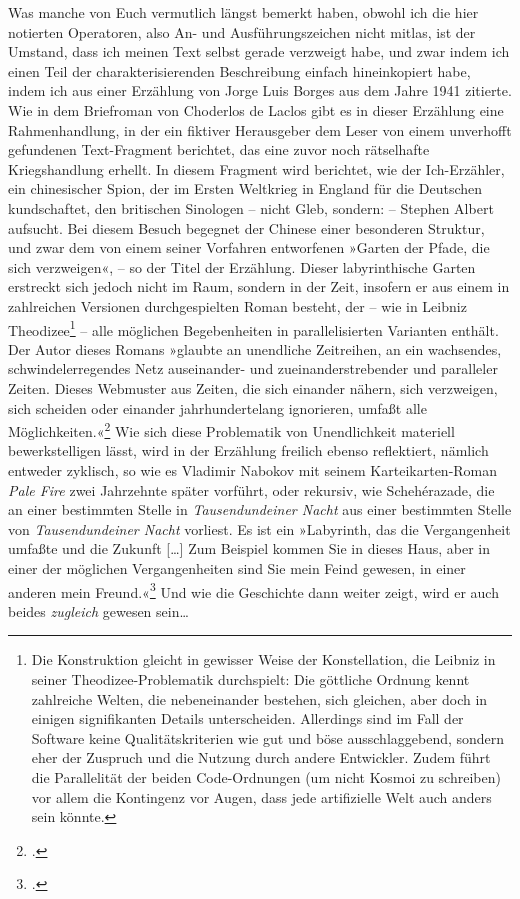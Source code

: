\documentclass[a4paper,11pt]{article}
\newcommand{\anf}[1]{»#1«}
\begin{document}
Was manche von Euch vermutlich längst bemerkt haben, obwohl ich die hier notierten Operatoren, also An- und Ausführungszeichen nicht mitlas, ist der Umstand, dass ich meinen Text selbst gerade verzweigt habe, und zwar indem ich einen Teil der charakterisierenden Beschreibung einfach hineinkopiert habe, indem ich aus einer Erzählung von Jorge Luis Borges aus dem Jahre 1941 zitierte. Wie in dem Briefroman von Choderlos de Laclos gibt es in dieser Erzählung eine Rahmenhandlung, in der ein fiktiver Herausgeber dem Leser von einem unverhofft gefundenen Text-Fragment berichtet, das eine zuvor noch rätselhafte Kriegshandlung erhellt. In diesem Fragment wird berichtet, wie der Ich-Erzähler, ein chinesischer Spion, der im Ersten Weltkrieg in England für die Deutschen kundschaftet, den britischen Sinologen – nicht Gleb, sondern: – Stephen Albert aufsucht. Bei diesem Besuch begegnet der Chinese einer besonderen Struktur, und zwar dem von einem seiner Vorfahren entworfenen \anf{Garten der Pfade, die sich verzweigen}, – so der Titel der Erzählung. Dieser labyrinthische Garten erstreckt sich jedoch nicht im Raum, sondern in der Zeit, insofern er aus einem in zahlreichen Versionen durchgespielten Roman besteht, der – wie in Leibniz Theodizee\footnote{Die Konstruktion gleicht in gewisser Weise der Konstellation, die Leibniz in seiner Theodizee-Problematik durchspielt: Die göttliche Ordnung kennt zahlreiche Welten, die nebeneinander bestehen, sich gleichen, aber doch in einigen signifikanten Details unterscheiden. Allerdings sind im Fall der Software keine Qualitätskriterien wie gut und böse ausschlaggebend, sondern eher der Zuspruch und die Nutzung durch andere Entwickler. Zudem führt die Parallelität der beiden Code-Ordnungen (um nicht Kosmoi zu schreiben) vor allem die Kontingenz vor Augen, dass jede artifizielle Welt auch anders sein könnte.} – alle möglichen Begebenheiten in parallelisierten Varianten enthält. Der Autor dieses Romans \anf{glaubte an unendliche Zeitreihen, an ein wachsendes, schwindelerregendes Netz auseinander- und zueinanderstrebender und paralleler Zeiten. Dieses Webmuster aus Zeiten, die sich einander nähern, sich verzweigen, sich scheiden oder einander jahrhundertelang ignorieren, umfaßt alle Möglichkeiten.}\footcite[172]{borges:1941} Wie sich diese Problematik von Unendlichkeit materiell bewerkstelligen lässt, wird in der Erzählung freilich ebenso reflektiert, nämlich entweder zyklisch, so wie es Vladimir Nabokov mit seinem Karteikarten-Roman \emph{Pale Fire} zwei Jahrzehnte später vorführt, oder rekursiv, wie Schehérazade, die an einer bestimmten Stelle in \emph{Tausendundeiner Nacht} aus einer bestimmten Stelle von \emph{Tausendundeiner Nacht} vorliest. Es ist ein \anf{Labyrinth, das die Vergangenheit umfaßte und die Zukunft [\ldots] Zum Beispiel kommen Sie in dieses Haus, aber in einer der möglichen Vergangenheiten sind Sie mein Feind gewesen, in einer anderen mein Freund.}\footcite[166/170]{borges:1941} Und wie die Geschichte dann weiter zeigt, wird er auch beides \emph{zugleich} gewesen sein\ldots %
\end{document}
